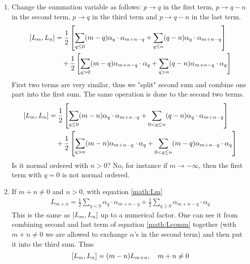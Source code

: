 \begin{enumerate}[label=(\alph*)]
	\item Change the summation variable as follows: $p \rightarrow q$ in the first term, $p \rightarrow q-n$ in the second term, $p \rightarrow q$ in the third term and $p \rightarrow  q - n$ in the last term.
		\begin{align*}
			\comm{L_m}{L_n} &= \frac{1}{2} \left[ \sum_{q \leq 0} (m-q) \alpha_{q} \cdot \alpha_{m+n-q} + \sum_{q \leq n}(q-n) \alpha_{q} \cdot \alpha_{m+n-q}  \right]\\
								 &\quad + \frac{1}{2} \left[  \sum_{q > 0} (m-q)\alpha_{m+n-q} \cdot \alpha_{q} + \sum_{q > n} (q-n) \alpha_{m+n-q} \cdot \alpha_{q} \right] \\
		\end{align*}
		First two terms are very similar, thus we "split" second sum and combine one part into the first sum. The same operation is done to the second two terms.
		\begin{align}
			\comm{L_m}{L_n} &= \frac{1}{2} \left[ \sum_{q \leq 0} (m-n) \alpha_{q} \cdot \alpha_{m+n-q} + \sum_{0 < q \leq n}(q-n) \alpha_{q} \cdot \alpha_{m+n-q}  \right] \notag \\
								 &\quad + \frac{1}{2} \left[  \sum_{q > n} (m-n)\alpha_{m+n-q} \cdot \alpha_{q} + \sum_{0 < q \leq n}  (m-q)\alpha_{m+n-q} \cdot \alpha_{q}\right] \label{math:Lcomm}
		\end{align}
		Is it normal ordered with $n>0$? No, for instance if $m \rightarrow -\infty$, then the first term with $q=0$ is not normal ordered.

	\item If $m+n \neq 0$ and $n>0$, with equation \eqref{math:Lm}
		\begin{align*}
			L_{m+n} = \frac{1}{2} \sum_{q < 0} \alpha_{q} \cdot \alpha_{m+n-q} + \frac{1}{2} \sum_{q \geq 0} \alpha_{m+n-q} \cdot \alpha_{q}
		\end{align*}
		This is the same as $\comm{L_m}{L_n}$ up to a numerical factor. One can see it from combining second and last term of equation \eqref{math:Lcomm} together (with $m+n \neq 0$ we are allowed to exchange $\alpha$'s in the second term) and then put it into the third sum. Thus
		\begin{equation*}
			\comm{L_m}{L_n} =	(m-n) L_{m+n}, \quad m+n \neq 0
		\end{equation*}


\end{enumerate}
